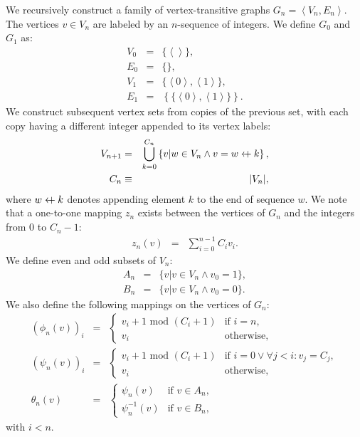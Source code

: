 \documentclass{article}
\newcommand{\la}{\left\langle}
\newcommand{\ra}{\right\rangle}
\newcommand{\beq}{\begin{eqnarray}}
\newcommand{\eeq}{\end{eqnarray}}
\newcommand{\append}{\leftarrow{\mkern-18mu}{+}\:}
\begin{document}
We recursively construct a family of vertex-transitive graphs
$G_n = \la V_n, E_n \ra$.
The vertices $v \in V_n$ are labeled by an $n$-sequence of integers.
We define $G_0$ and $G_1$ as:
\beq
V_0 &=& \{ \la\ra \}, \\
E_0 &=& \{ \}, \\
V_1 &=& \{\la{0}\ra,\la{1}\ra\}, \\
E_1 &=& \left\{\{\la{0}\ra,\la{1}\ra\}\right\}.
\eeq
We construct subsequent vertex sets from copies of the previous set,
with each copy having a different integer appended to its vertex labels:
\beq
\label{eq:vn}
V_{n+1} &=& \bigcup_{k = 0}^{C_n}
\left\{ v | w \in V_n \land v = w \append k \right\},
\\
C_n &\equiv& |V_n|,
\eeq
where $w \append k$ denotes appending element $k$ to the end of sequence $w$.
We note that a one-to-one mapping $z_n$ exists between the vertices of $G_n$ and the
integers from $0$ to $C_n - 1$:
\beq
z_n(v) &=& \sum_{i=0}^{n-1} C_i v_i.
\eeq
We define even and odd subsets of $V_n$:
\beq
A_n &=& \{ v | v \in V_n \land v_0 = 1 \}, \\
B_n &=& \{ v | v \in V_n \land v_0 = 0 \}.
\eeq
We also define the following mappings on the vertices of $G_n$:
\beq
(\phi_n(v))_i
&=&
\begin{cases}
v_i + 1 \mbox{ mod } (C_i + 1) & \mbox{if } i = n,
\\
v_i & \mbox{otherwise},
\end{cases}
\\
(\psi_n(v))_i
&=&
\begin{cases}
v_i + 1 \mbox{ mod } (C_i + 1)
& \mbox{if } i = 0 \lor \forall j < i: v_j = C_j, \\
v_i & \mbox{otherwise},
\end{cases}
\\
\theta_n(v)
&=&
\begin{cases}
\psi_n(v) & \mbox{if } v \in A_n, \\
\psi_n^{-1}(v) & \mbox{if } v \in B_n,
\end{cases}
\eeq
with $i < n$.
\end{document}
